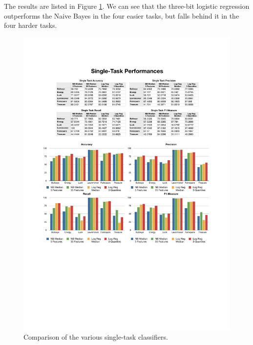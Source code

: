The results are listed in Figure \ref{fig:singletask}. We can see that the three-bit logistic regression outperforms the Naive Bayes in the four easier tasks, but falls behind it in the four harder tasks.

%
\begin{figure}
    \centering
    \setlength{\tabcolsep}{0.0130\linewidth}
    \includegraphics[width=\linewidth]{figures/SingleTask}
    \caption{Comparison of the various single-task classifiers.%
      \label{fig:singletask}}
\end{figure}


